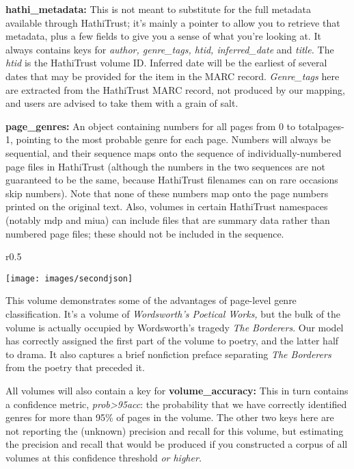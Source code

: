 \documentclass[paper=a4, fontsize=12pt]{scrartcl}
\numberwithin{equation}{section}		%
\numberwithin{figure}{section}			%
\numberwithin{table}{section}				%
\begin{document}
\vspace{2mm}
\noindent \textbf{hathi\_metadata:} This is not meant to substitute for the full metadata available through HathiTrust; it's mainly a pointer to allow you to retrieve that metadata, plus a few fields to give you a sense of what you're looking at. It always contains keys for \textit{author, genre\_tags, htid, inferred\_date} and \textit{title.} The \textit{htid} is the HathiTrust volume ID. Inferred date will be the earliest of several dates that may be provided for the item in the MARC record. \textit{Genre\_tags} here are extracted from the HathiTrust MARC record, not produced by our mapping, and users are advised to take them with a grain of salt.

\vspace{2mm}
\noindent \textbf{page\_genres:} An object containing numbers for all pages from 0 to totalpages-1, pointing to the most probable genre for each page. Numbers will always be sequential, and their sequence maps onto the sequence of individually-numbered page files in HathiTrust (although the numbers in the two sequences are not guaranteed to be the same, because HathiTrust filenames can on rare occasions skip numbers). Note that none of these numbers map onto the page numbers printed on the original text. Also, volumes in certain HathiTrust namespaces (notably mdp and miua) can include files that are summary data rather than numbered page files; these should not be included in the sequence.

\begin{wrapfigure}[26]{r}{0.5\textwidth}
  \begin{centering}
    \texttt{[image: images/secondjson]}
  \end{centering}
\end{wrapfigure}

This volume demonstrates some of the advantages of page-level genre classification. It's a volume of \textit{Wordsworth's Poetical Works,} but the bulk of the volume is actually occupied by Wordsworth's tragedy \textit{The Borderers}. Our model has correctly assigned the first part of the volume to poetry, and the latter half to drama. It also captures a brief nonfiction preface separating \textit{The Borderers} from the poetry that preceded it.

\vspace{2mm}
\noindent All volumes will also contain a key for \textbf{volume\_accuracy:} This in turn contains a confidence metric, \textit{prob>95acc}: the probability that we have correctly identified genres for more than 95\% of pages in the volume. The other two keys here are not reporting the (unknown) precision and recall for this volume, but estimating the precision and recall that would be produced if you constructed a corpus of all volumes at this confidence threshold \textit{or higher.}
\end{document}
